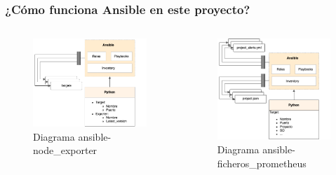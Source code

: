 \begin{frame}[label=ansible]
    \frametitle{¿Cómo funciona Ansible en este proyecto?}
    \begin{columns}
        \begin{column}{0.5\textwidth}
        \begin{figure}[H]
            \includegraphics[width=\textwidth]{include/ansible_node_exporter.png}
            \caption{Diagrama ansible-node\_exporter}
        \end{figure}
    \end{column}
    \begin{column}{0.5\textwidth}
        \begin{figure}[H]
                \includegraphics[width=\textwidth]{include/ansible_ficheros_prometheus.png}
                \caption{Diagrama ansible-ficheros\_prometheus}
            \end{figure}
        \end{column}
    \end{columns}
    
\end{frame}